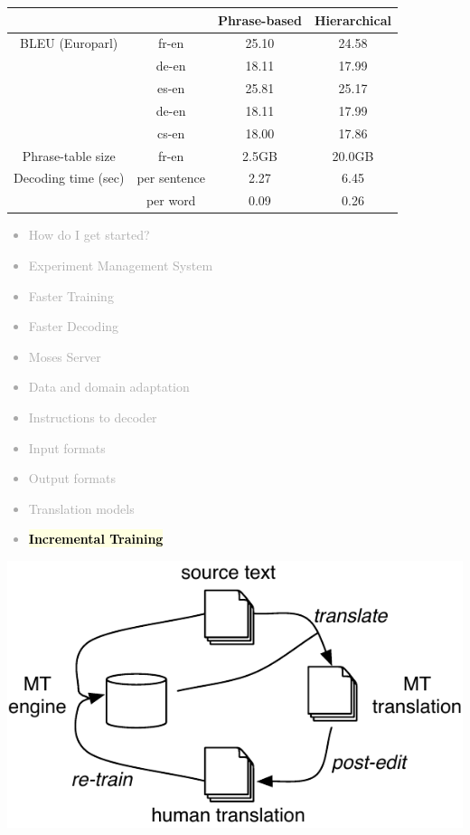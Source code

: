 \documentclass[landscape]{uedslides2C}
\newcommand{\currenttopic}[1]{\colorbox{lightyellow}{\textcolor{black}{\bf #1}}}
\begin{document}
\begin{table}[ht]
\begin{tabular}{| c c | c c |}
\hline 
		& 	& Phrase-based & Hierarchical \\
\hline
BLEU (Europarl) & fr-en & 25.10 & 24.58 \\
		& de-en & 18.11 & 17.99 \\
		& es-en & 25.81 & 25.17 \\
		& de-en & 18.11 & 17.99 \\
		& cs-en & 18.00 & 17.86 \\
\hline
Phrase-table size & fr-en & 2.5GB & 20.0GB \\
\hline
Decoding time (sec) & per sentence & 2.27 & 6.45 \\
		    & per word & 0.09 & 0.26 \\
\hline
\end{tabular}

\end{table}
	 



\vspace{-5mm}
\textcolor{darkgrey}{
\small
\begin{itemize} \itemsep -1mm
\item {How do I get started?}
\item {Experiment Management System}
\item {Faster Training}
\item {Faster Decoding}
\item {Moses Server}
\item {Data and domain adaptation}
\item {Instructions to decoder}
\item {Input formats}
\item {Output formats}
\item {Translation models}
\item \currenttopic{Incremental Training}
\end{itemize}
}


\begin{center}
\includegraphics[scale=2]{wikitrans.pdf}
\end{center}
\end{document}
